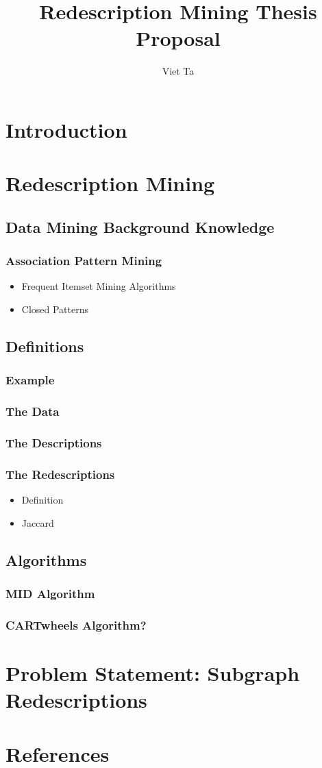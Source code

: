 \documentclass[12pt,a4paper,draft]{article}
\author{Viet Ta}
\title{Redescription Mining Thesis Proposal}
\begin{document}
\section{Introduction}
\section{Redescription Mining}
\subsection{Data Mining Background Knowledge}
\subsubsection{Association Pattern Mining}
\begin{itemize}
\item Frequent Itemset Mining Algorithms
\item Closed Patterns
\end{itemize}
\subsection{Definitions}
\subsubsection{Example}
\subsubsection{The Data}
\subsubsection{The Descriptions}
\subsubsection{The Redescriptions}
\begin{itemize}
	\item{Definition}
    \item{Jaccard}
\end{itemize}
\subsection{Algorithms}
\subsubsection{MID Algorithm}
\subsubsection{CARTwheels Algorithm?}
\section{Problem Statement: Subgraph Redescriptions}
\section{References}
\end{document}
